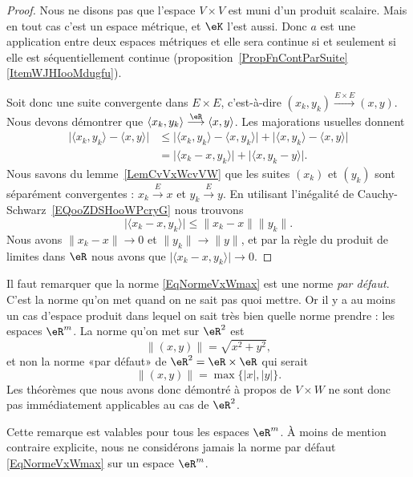 \begin{proof}
    Nous ne disons pas que l'espace \( V\times V\) est muni d'un produit scalaire. Mais en tout cas c'est un espace métrique, et \( \eK\) l'est aussi. Donc \( a\) est une application entre deux espaces métriques et elle sera continue si et seulement si elle est séquentiellement continue (proposition~\ref{PropFnContParSuite}\ref{ItemWJHIooMdugfu}).

    Soit donc une suite convergente dans \( E\times E\), c'est-à-dire \( (x_k,y_k)\stackrel{E\times E}{\longrightarrow}(x,y)\). Nous devons démontrer que \( \langle x_k, y_k\rangle \stackrel{\eR}{\longrightarrow}\langle x, y\rangle \). Les majorations usuelles donnent
    \begin{subequations}
        \begin{align}
            \big| \langle x_k, y_k\rangle -\langle x, y\rangle  \big|&\leq \big| \langle x_k, y_k\rangle -\langle x, y_k\rangle  \big|+\big| \langle x, y_k\rangle -\langle x, y\rangle  \big|\\
            &=\big| \langle x_k-x, y_k\rangle  \big|+\big| \langle x, y_k-y\rangle  \big|.
        \end{align}
    \end{subequations}
    Nous savons du lemme~\ref{LemCvVxWcvVW} que les suites \( (x_k)\) et \( (y_k)\) sont séparément convergentes : \( x_k\stackrel{E}{\longrightarrow}x\) et \( y_k\stackrel{E}{\longrightarrow}y\). En utilisant l'inégalité de Cauchy-Schwarz~\ref{EQooZDSHooWPcryG} nous trouvons
    \begin{equation}
        \big| \langle x_k-x, y_k\rangle  \big|\leq \| x_k-x \|\| y_k \|.
    \end{equation}
    Nous avons \( \| x_k-x \|\to 0\) et \( \| y_k \|\to \| y \|\), et par la règle du produit de limites dans \( \eR\) nous avons que \( \big| \langle x_k-x, y_k\rangle  \big|\to 0\).
\end{proof}

\begin{remark}		\label{RemTopoProdPasRm}
	Il faut remarquer que la norme \eqref{EqNormeVxWmax} est une norme \emph{par défaut}. C'est la norme qu'on met quand on ne sait pas quoi mettre. Or il y a au moins un cas d'espace produit dans lequel on sait très bien quelle norme prendre : les espaces $\eR^m$. La norme qu'on met sur $\eR^2$ est
	\begin{equation}
		\| (x,y) \|=\sqrt{x^2+y^2},
	\end{equation}
	et non la norme «par défaut» de $\eR^2=\eR\times\eR$ qui serait
	\begin{equation}
		\| (x,y) \|=\max\{ | x |,| y | \}.
	\end{equation}
	Les théorèmes que nous avons donc démontré à propos de $V\times W$ ne sont donc pas immédiatement applicables au cas de $\eR^2$.

	Cette remarque est valables pour tous les espaces $\eR^m$. À moins de mention contraire explicite, nous ne considérons jamais la norme par défaut \eqref{EqNormeVxWmax} sur un espace $\eR^m$.
\end{remark}

